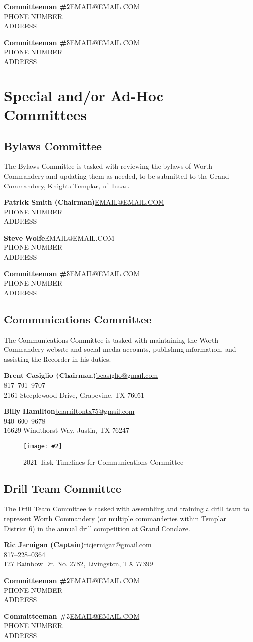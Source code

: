 \documentclass[letterpaper]{article}
\newcommand{\cman}[4]{\textbf{#1}\hfill{}\url{#2}\\\hphantom{0em}\hfill{}#3\\\hphantom{0em}\hfill{}#4}
\newcommand{\comm}[3]{\subsection*{#1 Committee\textsuperscript{#2}}The #1 Committee is tasked with #3\bigskip}
\newcommand{\gantt}[2]{
	\newgeometry{margin=0.125in}
	\begin{landscape}
		\begin{figure}
			\vspace*{\fill}
			\centering
			\caption{2021 Task Timelines for #1 Committee}
			\texttt{[image: \#2]}%
			\vspace*{\fill}
		\end{figure}
	\end{landscape}
	\restoregeometry
}
\begin{document}
		\cman{Committeeman \#2}{EMAIL@EMAIL.COM}{PHONE NUMBER}{ADDRESS}
		
		\cman{Committeeman \#3}{EMAIL@EMAIL.COM}{PHONE NUMBER}{ADDRESS}
	
	\pagebreak
	
	\section*{Special and/or Ad-Hoc Committees}
	
	\comm{Bylaws}{}{reviewing the bylaws of Worth Commandery and updating them as needed, to be submitted to the Grand Commandery, Knights Templar, of Texas.}
		
		\cman{Patrick Smith (Chairman)}{EMAIL@EMAIL.COM}{PHONE NUMBER}{ADDRESS}
		
		\cman{Steve Wolfe}{EMAIL@EMAIL.COM}{PHONE NUMBER}{ADDRESS}
		
		\cman{Committeeman \#3}{EMAIL@EMAIL.COM}{PHONE NUMBER}{ADDRESS}
	
	\pagebreak
	
	\comm{Communications}{}{maintaining the Worth Commandery website and social media accounts, publishing information, and assisting the Recorder in his duties.}
	
		\cman{Brent Casiglio (Chairman)}{bcasiglio@gmail.com}{817--701--9707}{2161 Steeplewood Drive, Grapevine, TX 76051}
		
		\cman{Billy Hamilton}{bhamiltontx75@gmail.com}{940--600--9678}{16629 Windthorst Way, Justin, TX 76247}
		
		
		\gantt{Communications}{2021GanttCommunications.pdf}
	
	\pagebreak
	
	\comm{Drill Team}{}{assembling and training a drill team to represent Worth Commandery (or multiple commanderies within Templar District \textnumero{} 6) in the annual drill competition at Grand Conclave.}
	
		\cman{Ric Jernigan (Captain)}{ricjernigan@gmail.com}{817--228--0364}{127 Rainbow Dr. No. 2782, Livingston, TX 77399}
		
		\cman{Committeeman \#2}{EMAIL@EMAIL.COM}{PHONE NUMBER}{ADDRESS}
		
		
		\cman{Committeeman \#3}{EMAIL@EMAIL.COM}{PHONE NUMBER}{ADDRESS}
\end{document}
